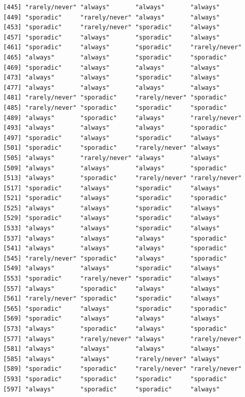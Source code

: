 \documentclass[
  letterpaper,
  DIV=11,
  numbers=noendperiod]{scrartcl}
\begin{document}
\begin{verbatim}
 [445] "rarely/never" "always"       "always"       "always"      
 [449] "sporadic"     "rarely/never" "always"       "always"      
 [453] "sporadic"     "rarely/never" "sporadic"     "always"      
 [457] "sporadic"     "always"       "sporadic"     "always"      
 [461] "sporadic"     "always"       "sporadic"     "rarely/never"
 [465] "always"       "always"       "sporadic"     "sporadic"    
 [469] "sporadic"     "always"       "always"       "always"      
 [473] "always"       "always"       "sporadic"     "always"      
 [477] "always"       "always"       "always"       "always"      
 [481] "rarely/never" "sporadic"     "rarely/never" "sporadic"    
 [485] "rarely/never" "sporadic"     "sporadic"     "sporadic"    
 [489] "always"       "sporadic"     "always"       "rarely/never"
 [493] "always"       "always"       "always"       "sporadic"    
 [497] "sporadic"     "always"       "sporadic"     "always"      
 [501] "sporadic"     "sporadic"     "rarely/never" "always"      
 [505] "always"       "rarely/never" "always"       "always"      
 [509] "always"       "always"       "always"       "sporadic"    
 [513] "always"       "sporadic"     "rarely/never" "rarely/never"
 [517] "sporadic"     "always"       "sporadic"     "always"      
 [521] "sporadic"     "always"       "sporadic"     "sporadic"    
 [525] "always"       "always"       "sporadic"     "always"      
 [529] "sporadic"     "always"       "sporadic"     "always"      
 [533] "always"       "always"       "sporadic"     "always"      
 [537] "always"       "always"       "always"       "sporadic"    
 [541] "always"       "always"       "always"       "sporadic"    
 [545] "rarely/never" "sporadic"     "always"       "sporadic"    
 [549] "always"       "always"       "sporadic"     "always"      
 [553] "sporadic"     "rarely/never" "sporadic"     "always"      
 [557] "always"       "sporadic"     "always"       "always"      
 [561] "rarely/never" "sporadic"     "sporadic"     "always"      
 [565] "sporadic"     "always"       "sporadic"     "sporadic"    
 [569] "sporadic"     "always"       "always"       "always"      
 [573] "always"       "sporadic"     "always"       "sporadic"    
 [577] "always"       "rarely/never" "always"       "rarely/never"
 [581] "always"       "always"       "always"       "always"      
 [585] "always"       "always"       "rarely/never" "always"      
 [589] "sporadic"     "sporadic"     "rarely/never" "rarely/never"
 [593] "sporadic"     "sporadic"     "sporadic"     "sporadic"    
 [597] "always"       "sporadic"     "sporadic"     "always"      

\end{verbatim}
\end{document}

